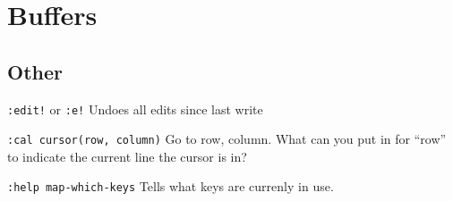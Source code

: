 \documentclass{article}
\begin{document}
\section{Buffers}

\subsection{Other}
\par\texttt{:edit!} or \texttt{:e!} Undoes all edits since last write
\par\texttt{:cal cursor(row, column)} Go to row, column. What can you put
in for ``row'' to indicate the current line the cursor is in?
\par\texttt{:help map-which-keys} Tells what keys are currenly in use.
\end{document}
